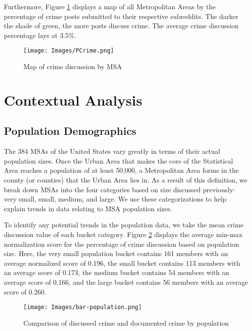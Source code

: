 \documentclass[12pt,oneside, letterpaper]{book}
\begin{document}
\par Furthermore, Figure \ref{fig:map-1} displays a map of all Metropolitan Areas by the percentage of crime posts submitted to their respective subreddits. The darker the shade of green, the more posts discuss crime. The average crime discussion percentage lays at 3.5\%.

\begin{figure}[ht]
    \texttt{[image: Images/PCrime.png]}
    \caption{Map of crime discussion by MSA}
    \label{fig:map-1}
\end{figure}

\section{Contextual Analysis}

\subsection{Population Demographics}

\par The 384 MSAs of the United States vary greatly in terms of their actual population sizes. Once the Urban Area that makes the core of the Statistical Area reaches a population of at least 50,000, a Metropolitan Area forms in the county (or counties) that the Urban Area lies in. As a result of this definition, we break down MSAs into the four categories based on size discussed previously: very small, small, medium, and large. We use these categorizations to help explain trends in data relating to MSA population sizes.

\par To identify any potential trends in the population data, we take the mean crime discussion value of each bucket category. Figure \ref{fig:graph-1} displays the average min-max normalization score for the percentage of crime discussion based on population size. Here, the very small population bucket contains 161 members with an average normalized score of 0.196, the small bucket contains 113 members with an average score of 0.173, the medium bucket contains 54 members with an average score of 0.166, and the large bucket contains 56 members with an average score of 0.260.

\begin{figure}[ht]
    \centering
    \texttt{[image: Images/bar-population.png]}
    \caption{Comparison of discussed crime and documented crime by population}
    \label{fig:graph-1}
\end{figure}
\end{document}
